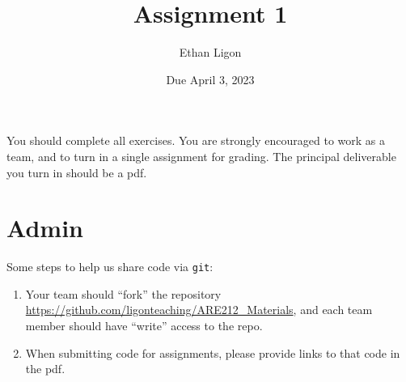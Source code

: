 \documentclass[12pt]{amsart}
\author{Ethan Ligon}
\date{Due April 3, 2023}
\title{Assignment 1}
\begin{document}
\maketitle
You should complete all exercises.   You are strongly encouraged to work as a  team, and to turn in a single assignment for grading.   The principal deliverable you turn in should be a pdf.
\section{Admin}
\label{sec:orge0c0d69}
Some steps to help us share code via \texttt{git}:
\begin{enumerate}
\item Your team should ``fork'' the repository \url{https://github.com/ligonteaching/ARE212\_Materials}, and each  team member should have ``write'' access to the repo.
\item When submitting code for assignments, please provide links to that code in the pdf.
\end{enumerate}
\end{document}
